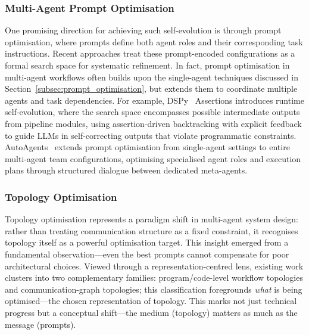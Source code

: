 \documentclass[]{selfevolagent}
\theoremstyle{plain}
\theoremstyle{definition}
\theoremstyle{remark}
\begin{document}
\subsubsection{Multi-Agent Prompt Optimisation}
One promising direction for achieving such self-evolution is through prompt optimisation, where prompts define both agent roles and their corresponding task instructions. Recent approaches treat these prompt-encoded configurations as a formal search space for systematic refinement. In fact, prompt optimisation in multi-agent workflows often builds upon the single-agent techniques discussed in Section~\ref{subsec:prompt_optimisation}, but extends them to coordinate multiple agents and task dependencies. 
For example, 
DSPy~\citep{DBLP:journals/corr/abs-2312-13382} Assertions introduces runtime self-evolution, where the search space encompasses possible intermediate outputs from pipeline modules, using assertion-driven backtracking with explicit feedback to guide LLMs in self-correcting outputs that violate programmatic constraints.
AutoAgents~\citep{chen2024autoagentsframeworkautomaticagent} extends prompt optimisation from single-agent settings to entire multi-agent team configurations, optimising specialised agent roles and execution plans through structured dialogue between dedicated meta-agents.

\subsubsection{Topology Optimisation}

Topology optimisation represents a paradigm shift in multi-agent system design: rather than treating communication structure as a fixed constraint, it recognises topology itself as a powerful optimisation target. This insight emerged from a fundamental observation—even the best prompts cannot compensate for poor architectural choices. Viewed through a representation-centred lens, existing work clusters into two complementary families: program/code-level workflow topologies and communication-graph topologies; this classification foregrounds \emph{what} is being optimised—the chosen representation of topology. This marks not just technical progress but a conceptual shift—the medium (topology) matters as much as the message (prompts).
\end{document}
